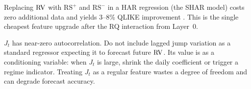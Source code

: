 
\begin{keyidea}
Replacing $\operatorname{RV}$ with $\mathrm{RS}^{+}$ and $\mathrm{RS}^{-}$ in a HAR regression (the SHAR model) costs zero additional data and yields 3--8\% QLIKE improvement \citep{PattonSheppard2015}.
This is the single cheapest feature upgrade after the RQ interaction from Layer~0.
\end{keyidea}

\begin{warning}
$J_t$ has near-zero autocorrelation.
Do not include lagged jump variation as a standard regressor expecting it to forecast future $\operatorname{RV}$.
Its value is as a conditioning variable: when $J_t$ is large, shrink the daily coefficient or trigger a regime indicator.
Treating $J_t$ as a regular feature wastes a degree of freedom and can degrade forecast accuracy.
\end{warning}

